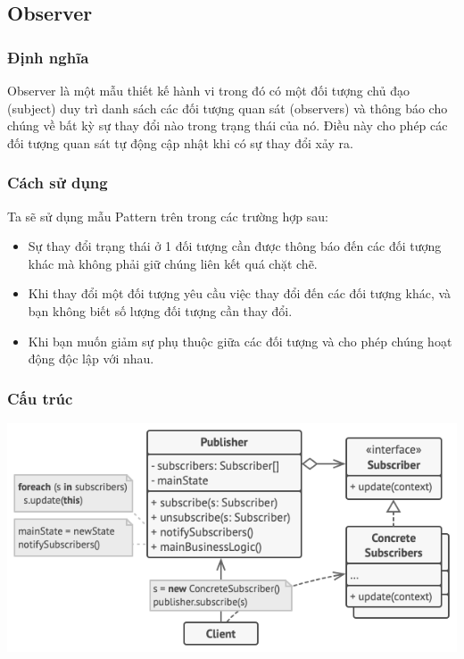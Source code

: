 \subsection{Observer}
\subsubsection{Định nghĩa}
Observer là một mẫu thiết kế hành vi trong đó có một đối tượng chủ đạo (subject) duy trì danh sách các đối tượng quan sát (observers) và thông báo cho chúng về bất kỳ sự thay đổi nào trong trạng thái của nó. Điều này cho phép các đối tượng quan sát tự động cập nhật khi có sự thay đổi xảy ra.
\subsubsection{Cách sử dụng}
Ta sẽ sử dụng mẫu Pattern trên trong các trường hợp sau:
\begin{itemize}
    \item Sự thay đổi trạng thái ở 1 đối tượng cần được thông báo đến các đối tượng khác mà không phải giữ chúng liên kết quá chặt chẽ.
    \item Khi thay đổi một đối tượng yêu cầu việc thay đổi đến các đối tượng khác, và bạn không biết số lượng đối tượng cần thay đổi.
    \item Khi bạn muốn giảm sự phụ thuộc giữa các đối tượng và cho phép chúng hoạt động độc lập với nhau.
\end{itemize}
\subsubsection{Cấu trúc}
\begin{center}
    \includegraphics[scale= 0.6]{image/behavioral/observer.png}
\end{center}

